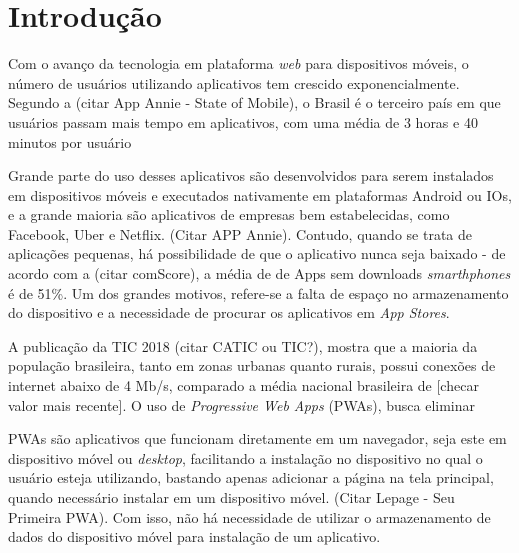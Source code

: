\chapter{Introdução} \label{cap:metod}

   Com o avanço da tecnologia em plataforma \textit{web} para dispositivos móveis, o número de usuários utilizando aplicativos tem crescido exponencialmente. Segundo a \citeonline{} (citar App Annie - State of Mobile), o Brasil é o terceiro país em que usuários passam mais tempo em aplicativos, com uma média de 3 horas e 40 minutos por usuário %
   
   Grande parte do uso desses aplicativos são desenvolvidos para serem instalados em dispositivos móveis e executados nativamente em plataformas Android ou IOs, e a grande maioria são aplicativos de empresas bem estabelecidas, como Facebook, Uber e Netflix. \cite{} (Citar APP Annie). Contudo, quando se trata de aplicações pequenas, há possibilidade de que o aplicativo nunca seja baixado - de acordo com a \citeonline{} (citar comScore), a média de de Apps sem downloads \textit{smarthphones} é de 51\%. Um dos grandes motivos, refere-se a falta de espaço no armazenamento do dispositivo e a necessidade de procurar os aplicativos em \textit{App Stores}. %
   
   A publicação da TIC 2018 (citar CATIC ou TIC?), mostra que a  maioria da população brasileira, tanto em zonas urbanas quanto rurais, possui conexões de internet abaixo de 4 Mb/s, comparado a média nacional brasileira de [checar valor mais recente]. O uso de \textit{Progressive Web Apps} (PWAs), busca eliminar %
   
   PWAs são aplicativos que funcionam diretamente em um navegador, seja este em dispositivo móvel ou \textit{desktop}, facilitando a instalação no dispositivo no qual o usuário esteja utilizando, bastando apenas adicionar a página na tela principal, quando necessário instalar em um dispositivo móvel. \cite{} (Citar Lepage - Seu Primeira PWA). Com isso, não há necessidade de utilizar o armazenamento de dados do dispositivo móvel para instalação de um aplicativo. %
   
